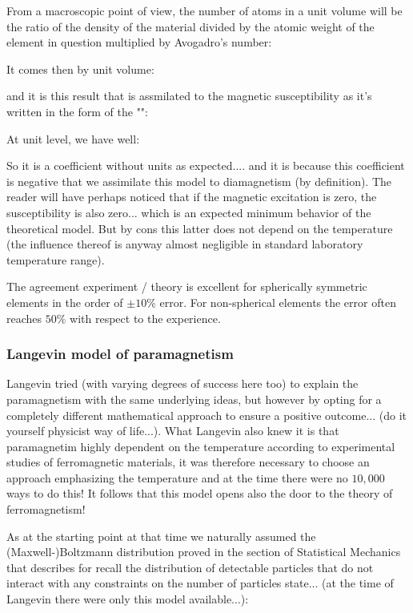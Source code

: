 	From a macroscopic point of view, the number of atoms in a unit volume will be the ratio of the density of the material divided by the atomic weight of the element in question multiplied by Avogadro's number:
	
	It comes then by unit volume:
	
	and it is this result that is assmilated to the magnetic susceptibility as it's written in the form of the "":
	
	At unit level, we have well:
	
	So it is a coefficient without units as expected.... and it is because this coefficient is negative that we assimilate this model to diamagnetism (by definition). The reader will have perhaps noticed that if the magnetic excitation is zero, the susceptibility is also zero... which is an expected minimum behavior of the theoretical model. But by cons this latter does not depend on the temperature (the influence thereof is anyway almost negligible in standard laboratory temperature range).

	The agreement experiment / theory is excellent for spherically symmetric elements in the order of $\pm 10\%$ error. For non-spherical elements the error often reaches $50\%$ with respect to the experience.
	
	\pagebreak
	\subsubsection{Langevin model of paramagnetism}
	Langevin tried (with varying degrees of success here too) to explain the paramagnetism with the same underlying ideas, but however by opting for a completely different mathematical approach to ensure a positive outcome... (do it yourself physicist way of life...). What Langevin also knew it is that paramagnetim highly dependent on the temperature according to experimental studies of ferromagnetic materials, it was therefore necessary to choose an approach emphasizing the temperature and at the time there were no $10,000$ ways to do this! It follows that this model opens also the door to the theory of ferromagnetism!

	As at the starting point at that time we naturally assumed the (Maxwell-)Boltzmann distribution proved in the section of Statistical Mechanics that describes for recall the distribution of detectable particles that do not interact with any constraints on the number of particles state... (at the time of Langevin there were only this model available...):
	
